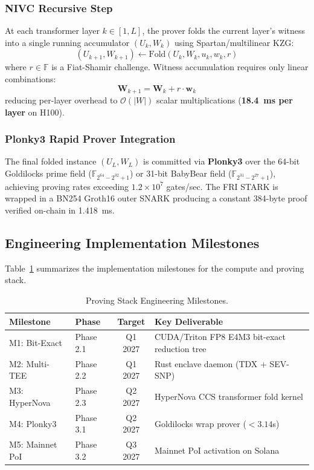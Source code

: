\documentclass[10pt,twocolumn,letterpaper]{article}
\begin{document}
\subsubsection{NIVC Recursive Step}
At each transformer layer $k \in [1, L]$, the prover folds the current layer's witness into a single running accumulator $(U_k, W_k)$ using Spartan/multilinear KZG:
\begin{equation}
(U_{k+1}, W_{k+1}) \leftarrow \text{Fold}(U_k, W_k, u_k, w_k, r)
\end{equation}
where $r \in \mathbb{F}$ is a Fiat-Shamir challenge. Witness accumulation requires only linear combinations:
\begin{equation}
\mathbf{W}_{k+1} = \mathbf{W}_k + r \cdot \mathbf{w}_k
\end{equation}
reducing per-layer overhead to $\mathcal{O}(|W|)$ scalar multiplications (\textbf{18.4~ms per layer} on H100).

\subsubsection{Plonky3 Rapid Prover Integration}
The final folded instance $(U_L, W_L)$ is committed via \textbf{Plonky3} over the 64-bit Goldilocks prime field ($\mathbb{F}_{2^{64}-2^{32}+1}$) or 31-bit BabyBear field ($\mathbb{F}_{2^{31}-2^{27}+1}$), achieving proving rates exceeding $1.2 \times 10^7$ gates/sec. The FRI STARK is wrapped in a BN254 Groth16 outer SNARK producing a constant 384-byte proof verified on-chain in 1.418~ms.

\subsection{Engineering Implementation Milestones}
Table~\ref{tab:milestones} summarizes the implementation milestones for the compute and proving stack.

\begin{table}[htbp]
\centering
\small
\caption{Proving Stack Engineering Milestones.}
\label{tab:milestones}
\begin{tabularx}{\columnwidth}{llcX}
\toprule
\textbf{Milestone} & \textbf{Phase} & \textbf{Target} & \textbf{Key Deliverable} \\
\midrule
M1: Bit-Exact & Phase 2.1 & Q1 2027 & CUDA/Triton FP8 E4M3 bit-exact reduction tree \\
M2: Multi-TEE & Phase 2.2 & Q1 2027 & Rust enclave daemon (TDX + SEV-SNP) \\
M3: HyperNova & Phase 2.3 & Q2 2027 & HyperNova CCS transformer fold kernel \\
M4: Plonky3 & Phase 3.1 & Q2 2027 & Goldilocks wrap prover ($< 3.14$s) \\
M5: Mainnet PoI & Phase 3.2 & Q3 2027 & Mainnet PoI activation on Solana \\
\bottomrule
\end{tabularx}
\end{table}
\end{document}
